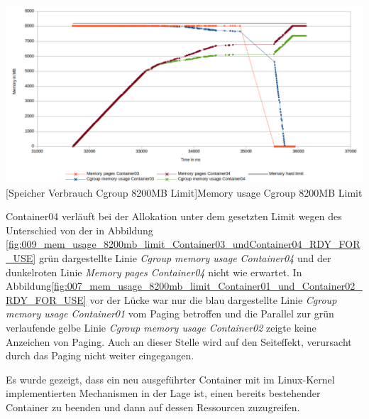 \vspace{1em}
\begin{minipage}{\linewidth}
	\centering
	\includegraphics[width=1\linewidth]{pics/010_mem_usage_8200mb_limit_Container03_undContainer04_RDY_FOR_USE_Focus.png}
	[Speicher Verbrauch Cgroup 8200MB Limit]{Memory usage Cgroup 8200MB Limit}
	\label{fig:010_mem_usage_8200mb_limit_Container03_undContainer04_RDY_FOR_USE_Focu}
\end{minipage}

Container04 verläuft bei der Allokation unter dem gesetzten Limit wegen des Unterschied von der in Abbildung \ref{fig:009_mem_usage_8200mb_limit_Container03_undContainer04_RDY_FOR_USE} grün dargestellte Linie \emph{Cgroup memory usage Container04} und der dunkelroten Linie \emph{Memory pages Container04} nicht wie erwartet.  In Abbildung\ref{fig:007_mem_usage_8200mb_limit_Container01_und_Container02_RDY_FOR_USE} vor der Lücke war nur die blau dargestellte Linie \emph{Cgroup memory usage Container01} vom Paging betroffen und die Parallel zur grün verlaufende gelbe Linie \emph{Cgroup memory usage Container02} zeigte keine Anzeichen von Paging. Auch an dieser Stelle wird auf den Seiteffekt, verursacht durch das Paging nicht weiter eingegangen.

Es wurde gezeigt, dass ein neu ausgeführter Container mit im Linux-Kernel implementierten Mechanismen in der Lage ist, einen bereits bestehender Container zu beenden und dann auf dessen Ressourcen zuzugreifen.



\pagebreak
